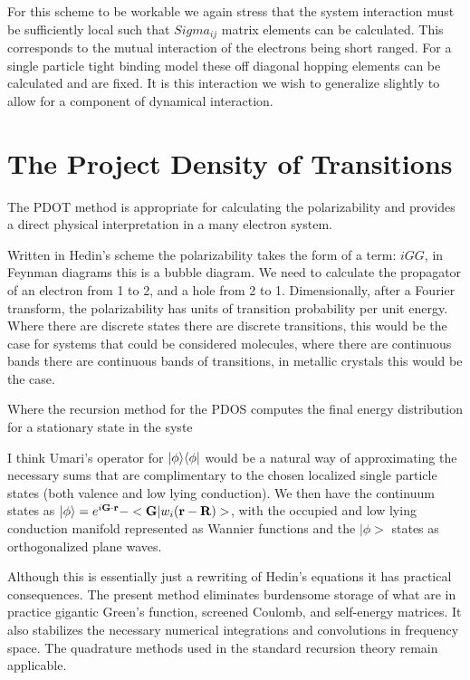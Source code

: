 For this scheme to be workable we again stress that the system interaction
must be sufficiently local such that $Sigma_{ij}$ matrix elements can be
calculated. This corresponds to the mutual interaction of the electrons being 
short ranged. For a single particle tight binding model these off diagonal hopping
elements can be calculated and are fixed. It is this interaction we wish
to generalize slightly to allow for a component of dynamical interaction.
\section{The Project Density of Transitions}
The PDOT\cite{annett93, haydock00, haydock16} method is 
appropriate for calculating the polarizability and provides a direct physical
interpretation in a many electron system. 

Written in Hedin's scheme the polarizability 
takes the form of a term: $iGG$, in Feynman diagrams this is a bubble diagram. We need to calculate the propagator
of an electron from 1 to 2, and a hole from 2 to 1. Dimensionally, after a Fourier transform,
the polarizability has units of transition probability per unit energy. Where there are discrete
states there are discrete transitions, this would be the case for systems
that could be considered molecules, where there are continuous bands there are continuous
bands of transitions, in metallic crystals this would be the case.

Where the recursion method for the PDOS computes the final energy distribution
for a stationary state in the syste


I think Umari's operator for $|\phi\rangle\langle\phi|$ would be a natural way of
approximating the necessary sums that are complimentary to the chosen
localized single particle states (both valence and low lying conduction).
We then have the continuum states as $|\phi\rangle=e^{i{\bf G}\cdot{\bf r}}-<{\bf G}|w_{i}({\bf r}-{\bf R})>$,
with the occupied and low lying conduction manifold represented as Wannier 
functions and the $|\phi>$ states as orthogonalized plane waves.

	Although this is essentially just a rewriting of Hedin's equations
it has practical consequences. The present method eliminates
burdensome storage of what are in practice gigantic Green's function, 
screened Coulomb, and self-energy matrices. It also 
stabilizes the necessary numerical integrations and convolutions in frequency space. 
The quadrature methods used in the standard recursion theory remain applicable.

